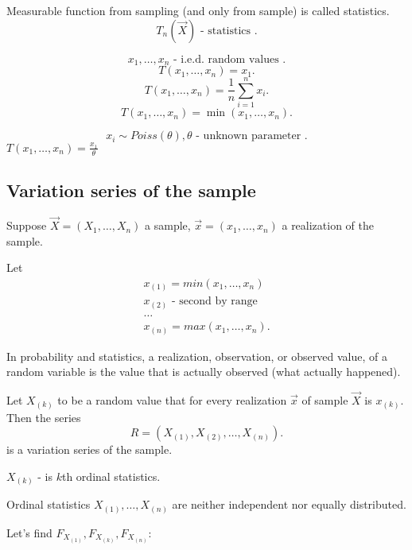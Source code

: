 \begin{definition}
    Measurable function from sampling (and only from sample) is called statistics.
    \[
    T_n(\vec{X}) \text{ - statistics }
    .\] 
\end{definition}
\begin{example}
    \[
    x_1, \ldots, x_n \text{ - i.e.d. random values }
    .\] 
    \[
    T(x_1, \ldots, x_n) = x_1
    .\] 
    \[
    T(x_1, \ldots, x_n) = \frac{1}{n} \sum_{i=1}^{n} x_i
    .\] 
    \[
    T(x_1, \ldots,x_n) = \min(x_1, \ldots, x_n)
    .\] 
\end{example}
\begin{example}
    \[
    x_i \sim Poiss(\theta), \theta \text{ - unknown parameter }
    .\] 
    \(T(x_1, \ldots, x_n) = \frac{x_1}{\theta}\) 
\end{example}



\subsection{Variation series of the sample}

Suppose $\vec{X} = (X_1, \ldots, X_n)$ a sample, $\vec{x} = (x_1, \ldots, x_n)$ a realization of the sample.

Let
\begin{align*}
    x_{(1)} = min(x_1, \ldots, x_n) \\
    x_{(2)} \text{ - second by range } \\
    \hdots \\
    x_{(n)} = max(x_1, \ldots, x_n)
.\end{align*}

In probability and statistics, a realization, observation, or observed value, of a random variable is the value that is actually observed (what actually happened).

Let $X_{(k)}$ to be a random value that for every realization $\vec{x}$ of sample $\vec{X}$ is $x_{(k)}$. Then the series
\[
R = \left( X_{(1)}, X_{(2)}, \ldots, X_{(n)} \right)
.\]
is a variation series of the sample.

$X_{(k)}$ - is $k$th ordinal statistics.

\begin{remark}
    Ordinal statistics $X_{(1)}, \ldots, X_{(n)}$ are neither independent nor equally distributed.
\end{remark}
Let's find $F_{X_{(1)}}, F_{X_{(k)}}, F_{X_{(n)}}$:

